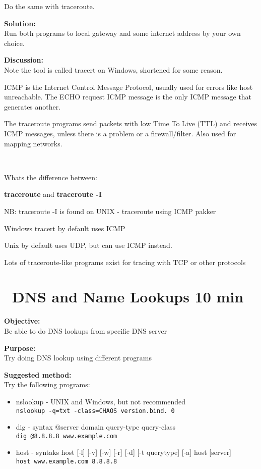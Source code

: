 \documentclass[a4paper,11pt,notitlepage]{report}
\begin{document}
Do the same with traceroute.

{\bf Solution:}\\
Run both programs to local gateway and some internet address by your own choice.

{\bf Discussion:}\\
Note the tool is called tracert on Windows, shortened for some reason.

ICMP is the Internet Control Message Protocol, usually used for errors like host unreachable. The ECHO request ICMP message is the only ICMP message that generates another.

The traceroute programs send packets with low Time To Live (TTL) and receives ICMP messages, unless there is a problem or a firewall/filter. Also used for mapping networks.

{\bf \faInfoCircle\ }

Whats the difference between:
\begin{list2}
\item {\bfseries traceroute} and {\bfseries traceroute -I}
\item NB: traceroute -I is found on UNIX - traceroute using ICMP pakker
\item Windows tracert by default uses ICMP
\item Unix by default uses UDP, but can use ICMP instead.
\item Lots of traceroute-like programs exist for tracing with TCP or other protocols
\end{list2}


\chapter{\faInfoCircle\ DNS and Name Lookups 10 min}
\label{ex:basic-dns-lookup}



{\bf Objective:}\\
Be able to do DNS lookups from specific DNS server

{\bf Purpose:}\\
Try doing DNS lookup using different programs

{\bf Suggested method:}\\
Try the following programs:
\begin{itemize}
\item nslookup - UNIX and Windows, but not recommended\\
\verb+nslookup -q=txt -class=CHAOS version.bind. 0+
\item dig - syntax @server domain query-type query-class\\
\verb+dig @8.8.8.8 www.example.com+
\item host - syntaks host [-l] [-v] [-w] [-r] [-d] [-t querytype] [-a] host [server]\\
\verb+host www.example.com 8.8.8.8+
\end{itemize}
\end{document}
